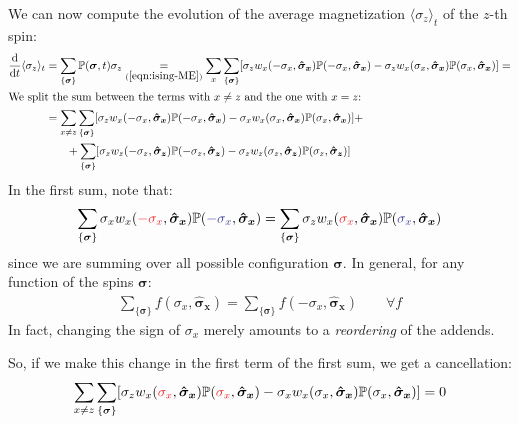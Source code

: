 \documentclass[../../main.tex]{subfiles}
\begin{document}
\medskip

We can now compute the evolution of the average magnetization $\langle \sigma_z \rangle_t$ of the $z$-th spin:
\begin{align}\nonumber
    \dv{t} \langle \sigma_z \rangle_t &= \sum_{\{\bm{\sigma}\}} \mathbb{P}(\bm{\sigma},t) \sigma_z \underset{(\ref{eqn:ising-ME})}{=}  \sum_x \sum_{\{\bm{\sigma}\}} [\sigma_z w_x(-\sigma_x, \bm{\hat{\sigma}_x}) \mathbb{P}(-\sigma_x, \bm{\hat{\sigma}_x}) - \sigma_z w_x(\sigma_x, \bm{\hat{\sigma}_x}) \mathbb{P}(\sigma_x, \bm{\hat{\sigma}_x})] =\\
    \shortintertext{We split the sum between the terms with $x \neq z$ and the one with $x = z$:} \nonumber
    &= \sum_{x \neq z} \sum_{\{\bm{\sigma}\}} [\sigma_z w_x(-\sigma_x, \bm{\hat{\sigma}_x}) \mathbb{P}(-\sigma_x, \bm{\hat{\sigma}_x}) - \sigma_x w_x(\sigma_x, \bm{\hat{\sigma}_x}) \mathbb{P}(\sigma_x, \bm{\hat{\sigma}_x})] + \\ \label{eqn:avg-magnetization-ising}
    &\quad \>\>\>\> + \sum_{\{\bm{\sigma}\}} [\sigma_z w_z(-\sigma_z, \bm{\hat{\sigma}_z}) \mathbb{P}(-\sigma_z, \bm{\hat{\sigma}_z}) - \sigma_z w_z(\sigma_z, \bm{\hat{\sigma}_z}) \mathbb{P}(\sigma_z, \bm{\hat{\sigma}_z})]
\end{align}
In the first sum, note that:
\begin{align*}
    \sum_{\{\bm{\sigma}\}} \sigma_x w_x(\textcolor{Red}{-\sigma_x}, \bm{\hat{\sigma}_x}) \mathbb{P}(\textcolor{Blue}{-\sigma_x}, \bm{\hat{\sigma}_x}) = \sum_{\{\bm{\sigma}\}} \sigma_z w_x(\textcolor{Red}{\sigma_x}, \bm{\hat{\sigma}_x}) \mathbb{P}(\textcolor{Blue}{\sigma_x}, \bm{\hat{\sigma}_x})
\end{align*}
since we are summing over all possible configuration $\bm{\sigma}$. In general, for any function of the spins $\bm{\sigma}$:
\begin{align*}
    \sum_{\{\bm{\sigma}\}} f(\sigma_x, \bm{\hat{\sigma}_x}) = \sum_{\{\bm{\sigma}\}} f(-\sigma_x, \bm{\hat{\sigma}_x}) \qquad \forall f
\end{align*}
In fact, changing the sign of $\sigma_x$ merely amounts to a \textit{reordering} of the addends.

\medskip

So, if we make this change in the first term of the first sum, we get a cancellation:
\begin{align}\label{eqn:sum-a}
    \sum_{x \neq z} \sum_{\{\bm{\sigma}\}} [\sigma_z w_x(\textcolor{Red}{\sigma_x}, \bm{\hat{\sigma}_x}) \mathbb{P}(\textcolor{Red}{\sigma_x}, \bm{\hat{\sigma}_x}) - \sigma_x w_x(\sigma_x, \bm{\hat{\sigma}_x}) \mathbb{P}(\sigma_x, \bm{\hat{\sigma}_x})] = 0
\end{align}
\end{document}
